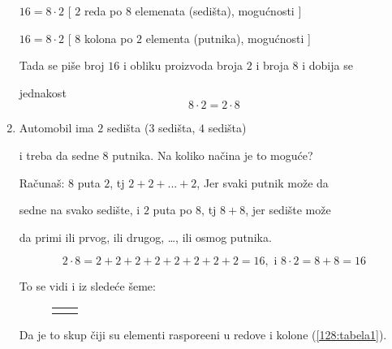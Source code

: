 \begin{zad}
\begin{enumerate}
            $16 = 8 \cdot 2$ [ $2$ reda po $8$ elemenata (sedi\v sta), mogu\' cnosti ]

            $16 = 8 \cdot 2$ [ $8$ kolona po $2$ elementa (putnika), mogu\' cnosti ]



            Tada se pi\v se broj $16$ i obliku proizvoda broja $2$ i broja $8$ i dobija se

            jednakost $$8 \cdot 2 = 2 \cdot 8$$



            \item Automobil ima $2$ sedi\v sta ($3$ sedi\v sta, $4$ sedi\v sta)

            i treba da sedne $8$ putnika. Na koliko na\v cina je to mogu\' ce?



            Ra\v cuna\v s: $8$ puta $2$, tj $2+2+...+2$, Jer svaki putnik mo\v ze da

            sedne na svako sedi\v ste, i $2$ puta po $8$, tj $8+8$, jer sedi\v ste mo\v ze

            da primi ili prvog, ili drugog, \dots, ili osmog putnika.

            $$2 \cdot 8 = 2+2+2+2+2+2+2+2 = 16, \text{ i } 8 \cdot 2 = 8 + 8 = 16$$



            To se vidi i iz slede\' ce \v seme:

            \begin{figure}

            \begin{tabular}{c c}




                &




            \end{tabular}

            \end{figure}

            Da je to skup \v ciji su elementi raspore\dj eni u redove i kolone (\ref{128:tabela1}).




\end{enumerate}
\end{zad}
